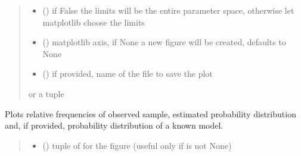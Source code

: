 \documentclass[letterpaper,10pt,english]{sphinxmanual}
\begin{document}
\begin{fulllineitems}
\begin{fulllineitems}
\begin{quote}
\begin{description}
\begin{itemize}
\item {} 
\sphinxAtStartPar
{} () \textendash{} if False the limits will be the entire parameter space, otherwise let matplotlib choose the limits

\item {} 
\sphinxAtStartPar
{} (\sphinxstyleliteralemphasis{\sphinxupquote{, }}) \textendash{} matplotlib axis, if None a new figure will be created, defaults to None

\item {} 
\sphinxAtStartPar
{} () \textendash{} if provided, name of the file to save the plot

\end{itemize}

\sphinxAtStartPar
{} or a tuple 

\end{description}\end{quote}

\end{fulllineitems}


\begin{fulllineitems}
\label{\detokenize{cubmods:cubmods.cush.CUBresCUSH.plot_ordinal}}
\pysigstartsignatures
{}
\pysigstopsignatures
\sphinxAtStartPar
Plots relative frequencies of observed sample, estimated probability distribution and,
if provided, probability distribution of a known model.
\begin{quote}\begin{description}
\begin{itemize}
\item {} 
\sphinxAtStartPar
{} () \textendash{} tuple of  for the figure (useful only if  is not None)


\end{itemize}
\end{description}
\end{quote}
\end{fulllineitems}
\end{fulllineitems}
\end{document}
